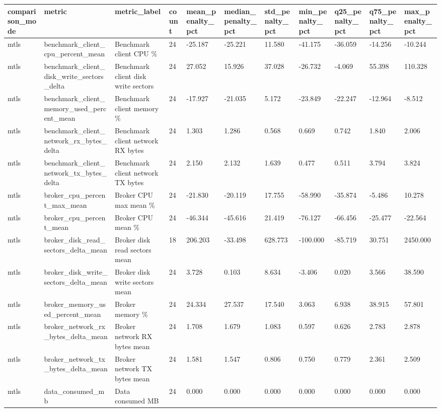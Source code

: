 \begin{tabular}{lllllllllll}
\hline
comparison\_mode & metric & metric\_label & count & mean\_penalty\_pct & median\_penalty\_pct & std\_penalty\_pct & min\_penalty\_pct & q25\_penalty\_pct & q75\_penalty\_pct & max\_penalty\_pct \\
\hline
mtls & benchmark\_client\_cpu\_percent\_mean & Benchmark client CPU \% & 24 & -25.187 & -25.221 & 11.580 & -41.175 & -36.059 & -14.256 & -10.244 \\
mtls & benchmark\_client\_disk\_write\_sectors\_delta & Benchmark client disk write sectors & 24 & 27.052 & 15.926 & 37.028 & -26.732 & -4.069 & 55.398 & 110.328 \\
mtls & benchmark\_client\_memory\_used\_percent\_mean & Benchmark client memory \% & 24 & -17.927 & -21.035 & 5.172 & -23.849 & -22.247 & -12.964 & -8.512 \\
mtls & benchmark\_client\_network\_rx\_bytes\_delta & Benchmark client network RX bytes & 24 & 1.303 & 1.286 & 0.568 & 0.669 & 0.742 & 1.840 & 2.006 \\
mtls & benchmark\_client\_network\_tx\_bytes\_delta & Benchmark client network TX bytes & 24 & 2.150 & 2.132 & 1.639 & 0.477 & 0.511 & 3.794 & 3.824 \\
mtls & broker\_cpu\_percent\_max\_mean & Broker CPU max mean \% & 24 & -21.830 & -20.119 & 17.755 & -58.990 & -35.874 & -5.486 & 10.278 \\
mtls & broker\_cpu\_percent\_mean & Broker CPU mean \% & 24 & -46.344 & -45.616 & 21.419 & -76.127 & -66.456 & -25.477 & -22.564 \\
mtls & broker\_disk\_read\_sectors\_delta\_mean & Broker disk read sectors mean & 18 & 206.203 & -33.498 & 628.773 & -100.000 & -85.719 & 30.751 & 2450.000 \\
mtls & broker\_disk\_write\_sectors\_delta\_mean & Broker disk write sectors mean & 24 & 3.728 & 0.103 & 8.634 & -3.406 & 0.020 & 3.566 & 38.590 \\
mtls & broker\_memory\_used\_percent\_mean & Broker memory \% & 24 & 24.334 & 27.537 & 17.540 & 3.063 & 6.938 & 38.915 & 57.801 \\
mtls & broker\_network\_rx\_bytes\_delta\_mean & Broker network RX bytes mean & 24 & 1.708 & 1.679 & 1.083 & 0.597 & 0.626 & 2.783 & 2.878 \\
mtls & broker\_network\_tx\_bytes\_delta\_mean & Broker network TX bytes mean & 24 & 1.581 & 1.547 & 0.806 & 0.750 & 0.779 & 2.361 & 2.509 \\
mtls & data\_consumed\_mb & Data consumed MB & 24 & 0.000 & 0.000 & 0.000 & 0.000 & 0.000 & 0.000 & 0.000 \\

\end{tabular}
